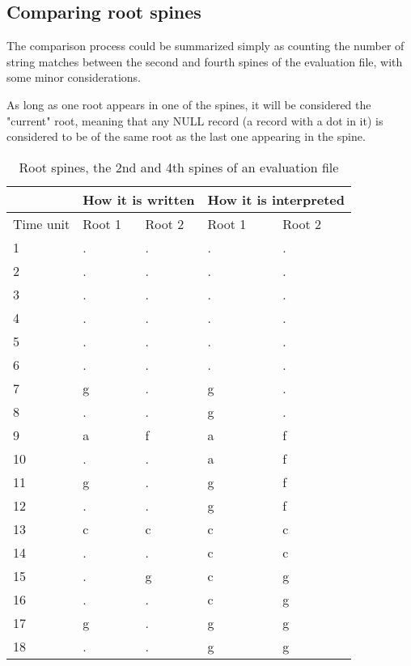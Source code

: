 	\subsection{Comparing root spines}
		The comparison process could be summarized simply as counting the number of string matches between the second and fourth spines of the evaluation file, with some minor considerations.

		As long as one root appears in one of the spines, it will be considered the "current" root, meaning that any NULL record (a record with a dot in it) is considered to be of the same root as the last one appearing in the spine.

		\begin{table}[tbp]
		\centering
		\begin{tabular}{l|ll|ll|}
		\cline{2-5}
		 & \multicolumn{2}{l|}{How it is written} & \multicolumn{2}{l|}{How it is interpreted} \\ \hline
		\multicolumn{1}{|l|}{Time unit} & \multicolumn{1}{l|}{Root 1} & Root 2 & \multicolumn{1}{l|}{Root 1} & Root 2 \\ \hline
		\multicolumn{1}{|l|}{1} & . & . & . & . \\ \cline{1-1}
		\multicolumn{1}{|l|}{2} & . & . & . & . \\ \cline{1-1}
		\multicolumn{1}{|l|}{3} & . & . & . & . \\ \cline{1-1}
		\multicolumn{1}{|l|}{4} & . & . & . & . \\ \cline{1-1}
		\multicolumn{1}{|l|}{5} & . & . & . & . \\ \cline{1-1}
		\multicolumn{1}{|l|}{6} & . & . & . & . \\ \cline{1-1}
		\multicolumn{1}{|l|}{7} & g & . & g & . \\ \cline{1-1}
		\multicolumn{1}{|l|}{8} & . & . & g & . \\ \cline{1-1}
		\multicolumn{1}{|l|}{9} & a & f & a & f \\ \cline{1-1}
		\multicolumn{1}{|l|}{10} & . & . & a & f \\ \cline{1-1}
		\multicolumn{1}{|l|}{11} & g & . & g & f \\ \cline{1-1}
		\multicolumn{1}{|l|}{12} & . & . & g & f \\ \cline{1-1}
		\multicolumn{1}{|l|}{13} & c & c & c & c \\ \cline{1-1}
		\multicolumn{1}{|l|}{14} & . & . & c & c \\ \cline{1-1}
		\multicolumn{1}{|l|}{15} & . & g & c & g \\ \cline{1-1}
		\multicolumn{1}{|l|}{16} & . & . & c & g \\ \cline{1-1}
		\multicolumn{1}{|l|}{17} & g & . & g & g \\ \cline{1-1}
		\multicolumn{1}{|l|}{18} & . & . & g & g \\ \hline
		\end{tabular}
		\caption{Root spines, the 2nd and 4th spines of an evaluation file}
		\label{table:roots}
		\end{table}

